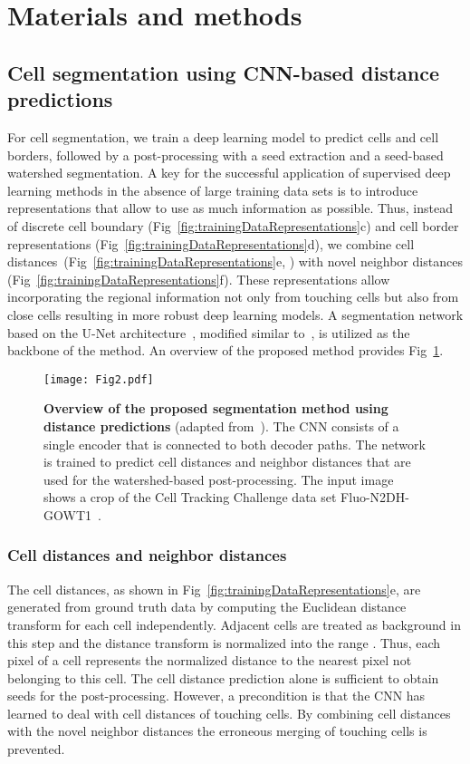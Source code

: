 \documentclass[10pt,letterpaper]{article}
\begin{document}
\section*{Materials and methods}
\subsection*{Cell segmentation using CNN-based distance predictions}
For cell segmentation, we train a deep learning model to predict cells and cell borders, followed by a post-processing with a seed extraction and a seed-based watershed segmentation. A key for the successful application of supervised deep learning methods in the absence of large training data sets is to introduce representations that allow to use as much information as possible. Thus, instead of discrete cell boundary (Fig~\ref{fig:trainingDataRepresentations}c) and cell border representations (Fig~\ref{fig:trainingDataRepresentations}d), we combine cell distances~(Fig~\ref{fig:trainingDataRepresentations}e, \cite{Li2019}) with novel neighbor distances (Fig~\ref{fig:trainingDataRepresentations}f). These representations allow incorporating the regional information not only from touching cells but also from close cells resulting in more robust deep learning models. A segmentation network based on the U-Net architecture~\cite{Ronneberger2015}, modified similar to~\cite{Li2019}, is utilized as the backbone of the method. An overview of the proposed method provides Fig~\ref{fig:architecture}.
\begin{figure}
\begin{adjustwidth}{-2.25in}{0in}
\centering
\texttt{[image: Fig2.pdf]}
\caption{\textbf{Overview of the proposed segmentation method using distance predictions} (adapted from~\cite{Li2019}). The CNN consists of a single encoder that is connected to both decoder paths. The network is trained to predict cell distances and neighbor distances that are used for the watershed-based post-processing. The input image shows a crop of the Cell Tracking Challenge data set Fluo-N2DH-GOWT1~\cite{Ulman2017, Maska2014}.}
\label{fig:architecture}
\end{adjustwidth}
\end{figure}

\subsubsection*{Cell distances and neighbor distances}
The cell distances, as shown in Fig~\ref{fig:trainingDataRepresentations}e, are generated from ground truth data by computing the Euclidean distance transform for each cell independently. Adjacent cells are treated as background in this step and the distance transform is normalized into the range . Thus, each pixel of a cell represents the normalized distance to the nearest pixel not belonging to this cell. The cell distance prediction alone is sufficient to obtain seeds for the post-processing. However, a precondition is that the CNN has learned to deal with cell distances of touching cells. By combining cell distances with the novel neighbor distances the erroneous merging of touching cells is prevented.
\end{document}
